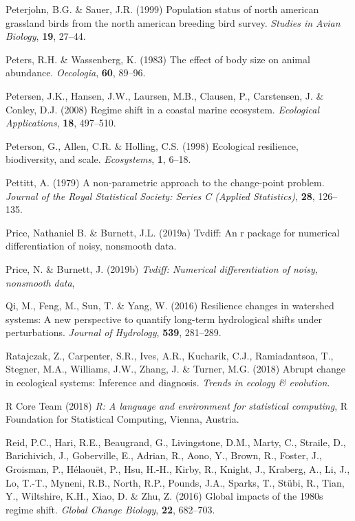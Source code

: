 \documentclass[print]{nuthesis}
\begin{document}
\leavevmode\hypertarget{ref-peterjohn1999population}{}%
Peterjohn, B.G. \& Sauer, J.R. (1999) Population status of north american grassland birds from the north american breeding bird survey. \emph{Studies in Avian Biology}, \textbf{19}, 27--44.

\leavevmode\hypertarget{ref-peters1983effect}{}%
Peters, R.H. \& Wassenberg, K. (1983) The effect of body size on animal abundance. \emph{Oecologia}, \textbf{60}, 89--96.

\leavevmode\hypertarget{ref-petersen2008regime}{}%
Petersen, J.K., Hansen, J.W., Laursen, M.B., Clausen, P., Carstensen, J. \& Conley, D.J. (2008) Regime shift in a coastal marine ecosystem. \emph{Ecological Applications}, \textbf{18}, 497--510.

\leavevmode\hypertarget{ref-peterson1998ecological}{}%
Peterson, G., Allen, C.R. \& Holling, C.S. (1998) Ecological resilience, biodiversity, and scale. \emph{Ecosystems}, \textbf{1}, 6--18.

\leavevmode\hypertarget{ref-pettitt1979non}{}%
Pettitt, A. (1979) A non-parametric approach to the change-point problem. \emph{Journal of the Royal Statistical Society: Series C (Applied Statistics)}, \textbf{28}, 126--135.

\leavevmode\hypertarget{ref-price2019tvdiff}{}%
Price, Nathaniel B. \& Burnett, J.L. (2019a) Tvdiff: An r package for numerical differentiation of noisy, nonsmooth data.

\leavevmode\hypertarget{ref-tvdiff}{}%
Price, N. \& Burnett, J. (2019b) \emph{Tvdiff: Numerical differentiation of noisy, nonsmooth data},

\leavevmode\hypertarget{ref-qi2016resilience}{}%
Qi, M., Feng, M., Sun, T. \& Yang, W. (2016) Resilience changes in watershed systems: A new perspective to quantify long-term hydrological shifts under perturbations. \emph{Journal of Hydrology}, \textbf{539}, 281--289.

\leavevmode\hypertarget{ref-ratajczak2018abrupt}{}%
Ratajczak, Z., Carpenter, S.R., Ives, A.R., Kucharik, C.J., Ramiadantsoa, T., Stegner, M.A., Williams, J.W., Zhang, J. \& Turner, M.G. (2018) Abrupt change in ecological systems: Inference and diagnosis. \emph{Trends in ecology \& evolution}.

\leavevmode\hypertarget{ref-base}{}%
R Core Team (2018) \emph{R: A language and environment for statistical computing}, R Foundation for Statistical Computing, Vienna, Austria.

\leavevmode\hypertarget{ref-reid_global_2016}{}%
Reid, P.C., Hari, R.E., Beaugrand, G., Livingstone, D.M., Marty, C., Straile, D., Barichivich, J., Goberville, E., Adrian, R., Aono, Y., Brown, R., Foster, J., Groisman, P., Hélaouët, P., Hsu, H.-H., Kirby, R., Knight, J., Kraberg, A., Li, J., Lo, T.-T., Myneni, R.B., North, R.P., Pounds, J.A., Sparks, T., Stübi, R., Tian, Y., Wiltshire, K.H., Xiao, D. \& Zhu, Z. (2016) Global impacts of the 1980s regime shift. \emph{Global Change Biology}, \textbf{22}, 682--703.
\end{document}
